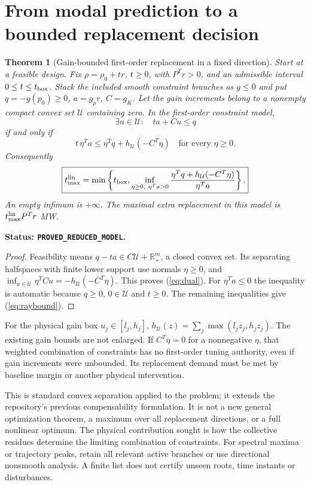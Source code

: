 \documentclass[11pt]{article}
\newtheorem{theorem}{Theorem}
\newcommand{\status}[1]{\par\smallskip\noindent\textbf{Status: \texttt{#1}.}\ }
\begin{document}
\section{From modal prediction to a bounded replacement decision}

\begin{theorem}[Gain-bounded first-order replacement in a fixed direction]
Start at a feasible design. Fix $\rho=\rho_0+t r$, $t\ge0$,
with $P^Tr>0$, and an admissible interval $0\le t\le t_{\rm box}$.
Stack the included smooth constraint branches as $g\le0$ and put
$q=-g(p_0)\ge0$, $a=g_\rho r$, $C=g_K$.
Let the gain increments belong to a nonempty compact convex set
$\mathcal U$ containing zero. In the first-order constraint model,
\[
 \exists u\in\mathcal U:\quad t a+C u\le q
\]
if and only if
\begin{equation}
 t\,\eta^Ta\le\eta^Tq+h_{\mathcal U}(-C^T\eta)
                      \quad\text{for every }\eta\ge0 . \label{eq:dual}
\end{equation}
Consequently
\begin{equation}
 \boxed{t_{\max}^{\rm lin}
 =\min\left\{t_{\rm box},
 \inf_{\eta\ge0,\ \eta^Ta>0}
 \frac{\eta^Tq+h_{\mathcal U}(-C^T\eta)}{\eta^Ta}\right\}.}
 \label{eq:raybound}
\end{equation}
An empty infimum is $+\infty$. The maximal extra replacement
in this model is $t_{\max}^{\rm lin}P^Tr$ MW.
\end{theorem}
\status{PROVED\_REDUCED\_MODEL}
\begin{proof}
Feasibility means $q-ta\in C\mathcal U+\mathbb R_+^m$,
a closed convex set. Its separating halfspaces with finite
lower support use normals $\eta\ge0$, and
$\inf_{u\in\mathcal U}\eta^TCu=-h_{\mathcal U}(-C^T\eta)$.
This proves (\ref{eq:dual}). For $\eta^Ta\le0$ the inequality
is automatic because $q\ge0$, $0\in\mathcal U$ and $t\ge0$.
The remaining inequalities give (\ref{eq:raybound}).
\end{proof}
For the physical gain box $u_j\in[l_j,h_j]$,
$h_{\mathcal U}(z)=\sum_j\max(l_jz_j,h_jz_j)$.
The existing gain bounds are not enlarged.
If $C^T\eta=0$ for a nonnegative $\eta$, that weighted combination
of constraints has no first-order tuning authority, even if gain
increments were unbounded. Its replacement demand must be met
by baseline margin or another physical intervention.

This is standard convex separation applied to the problem; it
extends the repository's previous compensability formulation.
It is not a new general optimization theorem, a maximum over
all replacement directions, or a full nonlinear optimum.
The physical contribution sought is how the collective residues
determine the limiting combination of constraints.
For spectral maxima or trajectory peaks, retain all relevant
active branches or use directional nonsmooth analysis.
A finite list does not certify unseen roots, time instants or
disturbances.
\end{document}
